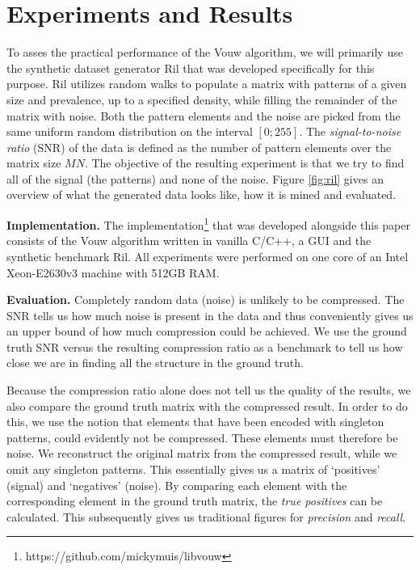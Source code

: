 \documentclass{llncs}
\begin{document}
\section{Experiments and Results}

To asses the practical performance of the Vouw algorithm, we will primarily use the synthetic dataset generator Ril that was developed specifically for this purpose. Ril utilizes random walks to populate a matrix with patterns of a given size and prevalence, up to a specified density, while filling the remainder of the matrix with noise. Both the pattern elements and the noise are picked from the same uniform random distribution on the interval $[0;255]$. The \emph{signal-to-noise ratio} (SNR) of the data is defined as the number of pattern elements over the matrix size $MN$. The objective of the resulting experiment is that we try to find all of the signal (the patterns) and none of the noise. Figure \ref{fig:ril} gives an overview of what the generated data looks like, how it is mined and evaluated.

\smallskip \noindent \textbf{Implementation.} %
The implementation\footnote{https://github.com/mickymuis/libvouw} that was developed alongside this paper consists of the Vouw algorithm written in vanilla C/C++, a GUI and the synthetic benchmark Ril. All experiments were performed on one core of an Intel Xeon-E2630v3 machine with 512GB RAM.

\smallskip \noindent \textbf{Evaluation.} %
Completely random data (noise) is unlikely to be compressed. The SNR tells us how much noise is present in the data and thus conveniently gives us an upper bound of how much compression could be achieved. We use the ground truth SNR versus the resulting compression ratio as a benchmark to tell us how close we are in finding all the structure in the ground truth. 

Because the compression ratio alone does not tell us the quality of the results, we also compare the ground truth matrix with the compressed result. In order to do this, we use the notion that elements that have been encoded with singleton patterns, could evidently not be compressed. These elements must therefore be noise. We reconstruct the original matrix from the compressed result, while we omit any singleton patterns. This essentially gives us a matrix of `positives' (signal) and `negatives' (noise). By comparing each element with the corresponding element in the ground truth matrix, the \emph{true positives} can be calculated. This subsequently gives us traditional figures for \emph{precision} and \emph{recall}.
\end{document}
